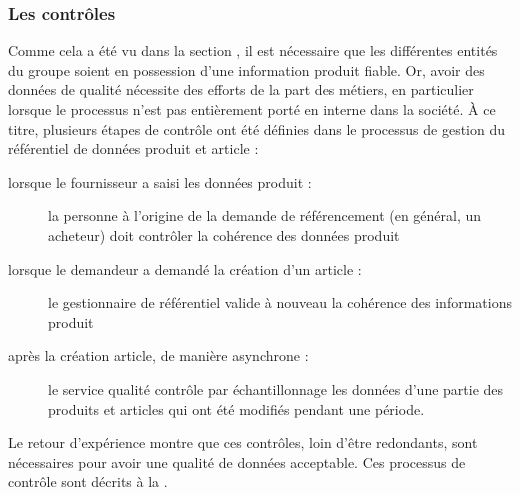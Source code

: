             \subsubsection{Les contrôles}
            \label{controles}
            Comme cela a été vu dans la section , il est nécessaire que les différentes entités du groupe soient en possession d'une information produit fiable.
            Or, avoir des données de qualité nécessite des efforts de la part des métiers, en particulier lorsque le processus n'est pas entièrement porté en interne dans la société.
            \`{A} ce titre, plusieurs étapes de contrôle ont été définies dans le processus de gestion du référentiel de données produit et article :
            \begin{description}
                \item[lorsque le fournisseur a saisi les données produit :] la personne à l'origine de la demande de référencement (en général, un acheteur) doit contrôler la cohérence des données produit
                \item[lorsque le demandeur a demandé la création d'un article :]  le gestionnaire de référentiel valide à nouveau la cohérence des informations produit
                \item[après la création article, de manière asynchrone :] le service qualité contrôle par échantillonnage les données d'une partie des produits et articles qui ont été modifiés pendant une période.
            \end{description}
            Le retour d'expérience montre que ces contrôles, loin d'être redondants, sont nécessaires pour avoir une qualité de données acceptable.
            Ces processus de contrôle sont décrits à la .

